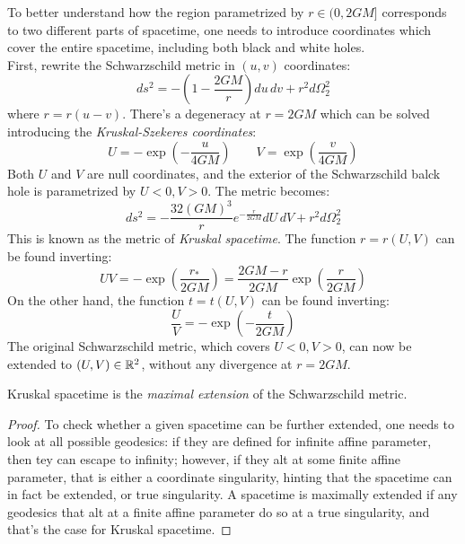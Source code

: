 To better understand how the region parametrized by $ r \in (0, 2GM] $ corresponds to two different parts of spacetime, one needs to introduce coordinates which cover the entire spacetime, including both black and white holes.\\
First, rewrite the Schwarzschild metric in $ (u,v) $ coordinates:
\begin{equation*}
  ds^2 = - \left( 1 - \frac{2GM}{r} \right) du\,dv + r^2 d\Omega_2^2
\end{equation*}
where $ r = r(u - v) $. There's a degeneracy at $ r = 2GM $ which can be solved introducing the \textit{Kruskal-Szekeres coordinates}:
\begin{equation}
  U = - \exp \left( - \frac{u}{4GM} \right)
  \qquad
  V = \exp \left( \frac{v}{4GM} \right)
  \label{eq:6.8}
\end{equation}
Both $ U $ and $ V $ are null coordinates, and the exterior of the Schwarzschild balck hole is parametrized by $ U < 0, V > 0 $. The metric becomes:
\begin{equation}
  ds^2 = - \frac{32 (GM)^3}{r} e^{-\frac{r}{2GM}} dU\,dV + r^2 d\Omega_2^2
  \label{eq:6.9}
\end{equation}
This is known as the metric of \textit{Kruskal spacetime}. The function $ r = r(U,V) $ can be found inverting:
\begin{equation}
  UV = - \exp \left( \frac{r_*}{2GM} \right) = \frac{2GM - r}{2GM} \exp \left( \frac{r}{2GM} \right)
  \label{eq:6.10}
\end{equation}
On the other hand, the function $ t = t(U,V) $ can be found inverting:
\begin{equation}
  \frac{U}{V} = - \exp \left( - \frac{t}{2GM} \right)
  \label{eq:6.11}
\end{equation}
The original Schwarzschild metric, which covers $ U < 0, V > 0 $, can now be extended to $ (U,V) \in \mathbb{R}^2 $, without any divergence at $ r = 2GM $.

\begin{proposition}
  Kruskal spacetime is the \textit{maximal extension} of the Schwarzschild metric.
\end{proposition}
\begin{proof}
  To check whether a given spacetime can be further extended, one needs to look at all possible geodesics: if they are defined for infinite affine parameter, then tey can escape to infinity; however, if they alt at some finite affine parameter, that is either a coordinate singularity, hinting that the spacetime can in fact be extended, or true singularity. A spacetime is maximally extended if any geodesics that alt at a finite affine parameter do so at a true singularity, and that's the case for Kruskal spacetime.
\end{proof}

